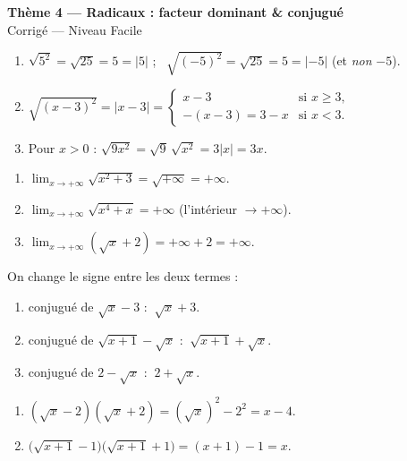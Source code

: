 \documentclass[11pt,a4paper]{article}
\begin{document}
\begin{center}
{\Large\bfseries\color{primarydark}Thème 4 — Radicaux : facteur dominant \& conjugué}\\[2pt]
{\large\color{excol}Corrigé — Niveau Facile}
\end{center}
\vspace{6pt}

\begin{correction}[$\sqrt{x^2}=|x|$]
\begin{enumerate}[label=\alph*),leftmargin=2em,itemsep=3pt]
  \item $\sqrt{5^2}=\sqrt{25}=5=|5|$ ; \ $\sqrt{(-5)^2}=\sqrt{25}=5=|-5|$ (et \emph{non} $-5$).
  \item $\sqrt{(x-3)^2}=|x-3|=\begin{cases} x-3 & \text{si } x\geq 3,\\ -(x-3)=3-x & \text{si } x<3.\end{cases}$
  \item Pour $x>0$ : $\sqrt{9x^2}=\sqrt{9}\,\sqrt{x^2}=3|x|=3x$.
\end{enumerate}
\end{correction}

\begin{correction}
\begin{enumerate}[label=\alph*),leftmargin=2em,itemsep=3pt]
  \item $\displaystyle\lim_{x\to+\infty}\sqrt{x^2+3}=\sqrt{+\infty}=+\infty$.
  \item $\displaystyle\lim_{x\to+\infty}\sqrt{x^4+x}=+\infty$ (l'intérieur $\to+\infty$).
  \item $\displaystyle\lim_{x\to+\infty}(\sqrt{x}+2)=+\infty+2=+\infty$.
\end{enumerate}
\end{correction}

\begin{correction}
On change le signe entre les deux termes :
\begin{enumerate}[label=\alph*),leftmargin=2em,itemsep=3pt]
  \item conjugué de $\sqrt{x}-3$ : $\ \sqrt{x}+3$.
  \item conjugué de $\sqrt{x+1}-\sqrt{x}$ : $\ \sqrt{x+1}+\sqrt{x}$.
  \item conjugué de $2-\sqrt{x}$ : $\ 2+\sqrt{x}$.
\end{enumerate}
\end{correction}

\begin{correction}
\begin{enumerate}[label=\alph*),leftmargin=2em,itemsep=3pt]
  \item $(\sqrt{x}-2)(\sqrt{x}+2)=(\sqrt{x})^2-2^2=x-4$.
  \item $\bigl(\sqrt{x+1}-1\bigr)\bigl(\sqrt{x+1}+1\bigr)=(x+1)-1=x$.
\end{enumerate}
\end{correction}
\end{document}
